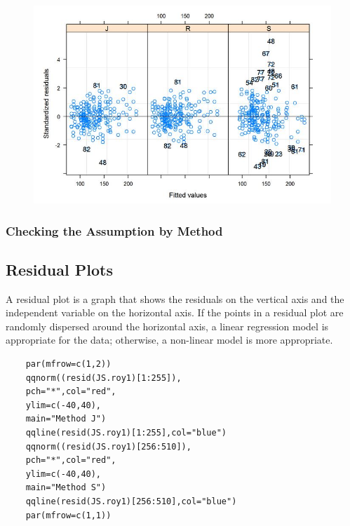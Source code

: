 \documentclass[Main.tex]{subfiles}
\begin{document}
\begin{figure}[h!]
	\centering
	\includegraphics[width=0.7\linewidth]{images/bloodnlmeResidPlot2B}
\end{figure}


\newpage

\subsubsection{Checking the Assumption by Method}

\subsection{Residual Plots}
A residual plot is a graph that shows the residuals on the vertical axis and the independent variable on the horizontal axis. If the points in a residual plot are randomly dispersed around the horizontal axis, a linear regression model is appropriate for the data; otherwise, a non-linear model is more appropriate.

\begin{framed}
	\begin{verbatim}
	par(mfrow=c(1,2))
	qqnorm((resid(JS.roy1)[1:255]),
	pch="*",col="red",
	ylim=c(-40,40),
	main="Method J")
	qqline(resid(JS.roy1)[1:255],col="blue")
	qqnorm((resid(JS.roy1)[256:510]),
	pch="*",col="red",
	ylim=c(-40,40),
	main="Method S")
	qqline(resid(JS.roy1)[256:510],col="blue")
	par(mfrow=c(1,1))
	\end{verbatim}	
\end{framed}
\end{document}
